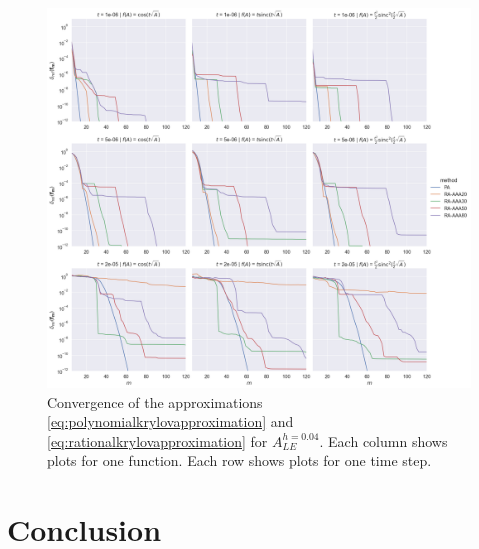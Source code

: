 \begin{figure}[h]
    \centering
    \includegraphics[width=.9\textwidth]{img/trigonometric/cnvg_h4e-02_methods_ts.png}
    \caption{
        Convergence of the approximations \eqref{eq:polynomialkrylovapproximation}
        and \eqref{eq:rationalkrylovapproximation} for $A_{LE}^{h=0.04}$. Each column
        shows plots for one function. Each row shows plots for one time step.
        }
        \label{fig:trigonometricconvergences}
\end{figure}

\section{Conclusion}
\label{sec:conclusion}

